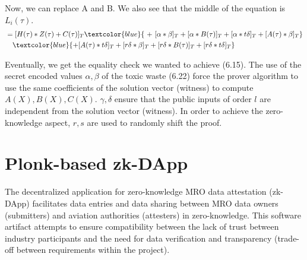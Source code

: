Now, we can replace A and B. We also see that the middle of the equation is \(L_i(\tau)\).
 \begin{equation*}
     \begin{split}
     &=[H(\tau) * Z(\tau) + C(\tau)]_T \textcolor{blue}{\ +\  [\alpha * \beta]_T + [\alpha * B(\tau)]_T + [\alpha * t\delta]_T + [A(\tau) * \beta]_T} \\
     &\ \ \ \textcolor{blue}{+ [A(\tau) * t\delta]_T + [r\delta * \beta]_T + [r\delta * B(\tau)]_T + [r\delta * t\delta]_T}
     \end{split}
 \end{equation*}

Eventually, we get the equality check we wanted to achieve (6.15). The use of the secret encoded values \(\alpha, \beta\) of the toxic waste (6.22) force the prover algorithm to use the same coefficients of the solution vector (witness) to compute \(A(X), B(X), C(X)\). \(\gamma, \delta\) ensure that the public inputs of order \(l\) are independent from the solution vector (witness). In order to achieve the zero-knowledge aspect, \(r, s\) are used to randomly shift the proof.

\section{Plonk-based zk-DApp}
The decentralized application for zero-knowledge MRO data attestation (zk-DApp) facilitates data entries and data sharing between MRO data owners (submitters) and aviation authorities (attesters) in zero-knowledge. This software artifact attempts to ensure compatibility between the lack of trust between industry participants and the need for data verification and transparency (trade-off between requirements within the project).
